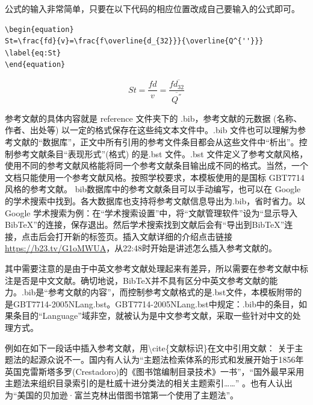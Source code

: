 公式的输入非常简单，只要在以下代码的相应位置改成自己要输入的公式即可。
\begin{lstlisting}[caption={公式插入代码}]
\begin{equation}
St=\frac{fd}{v}=\frac{f\overline{d_{32}}}{\overline{Q^{''}}}
\label{eq:St}
\end{equation}
\end{lstlisting}
\begin{equation}
St=\frac{fd}{v}=\frac{f\overline{d_{32}}}{\overline{Q^{''}}}
\label{eq:St}
\end{equation}



参考文献的具体内容就是 reference 文件夹下的 .bib，参考文献的元数据 (名称、作者、出处等) 以一定的格式保存在这些纯文本文件中。.bib 文件也可以理解为参考文献的“数据库”，正文中所有引用的参考文件条目都会从这些文件中“析出”。控制参考文献条目“表现形式”(格式) 的是.bst 文件。.bst 文件定义了参考文献风格，使用不同的参考文献风格能将同一个参考文献条目输出成不同的格式。当然，一个文档只能使用一个参考文献风格。按照学校要求，本模板使用的是国标 GBT7714 风格的参考文献。
bib数据库中的参考文献条目可以手动编写，也可以在 Google 的学术搜索中找到。各大数据库也支持将参考文献信息导出为.bib，省时省力。以 Google 学术搜索为例：在“学术搜索设置”中，将“文献管理软件”设为“显示导入 BibTeX”的连接，保存退出。然后学术搜索找到文献后会有“导出到BibTeX”连接，点击后会打开新的标签页。插入文献详细的介绍点击链接\url{https://b23.tv/G1oMWUA}，从22:48时开始是讲述怎么插入参考文献的。\par
其中需要注意的是由于中英文参考文献处理起来有差异，所以需要在参考文献中标注是否是中文文献。确切地说，BibTeX并不具有区分中英文参考文献的能力。.bib是“参考文献的内容”，而控制参考文献格式的是.bst文件，本模板附带的是GBT7714-2005NLang.bst。GBT7714-2005NLang.bst中规定：.bib中的条目，如果条目的“Language”域非空，就被认为是中文参考文献，采取一些针对中文的处理方式。\par
例如在如下一段话中插入参考文献，用\textbackslash cite\{文献标识\}在文中引用文献：
关于主题法的起源众说不一。国内有人认为“主题法检索体系的形式和发展开始于1856年英国克雷斯塔多罗(Crestadoro)的《图书馆编制目录技术》一书”，“国外最早采用主题法来组织目录索引的是杜威十进分类法的相关主题索引……” \cite{Jiang2005Size}。也有人认出为“美国的贝加逊·富兰克林出借图书馆第一个使用了主题法”\cite{Takahashi1996Structure,Xia2002Analysis,Jiang1989}。

